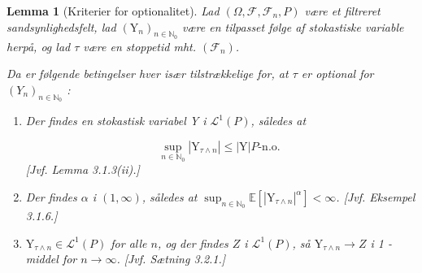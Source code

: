 \documentclass{article}
\newcommand{\1}{\mathbbm{1}}
\theoremstyle{boxed}
\newtheorem{lemma}[theorem]{Lemma}
\begin{document}
\begin{theorem-box}
    \begin{lemma}[Kriterier for optionalitet]
        Lad $\left(\Omega, \mathcal{F}, \mathcal{F}_n, P\right)$ være et filtreret sandsynlighedsfelt, lad $\left(\mathrm{Y}_n\right)_{n \in \mathbb{N}_0}$ være en tilpasset følge af stokastiske variable herpå, og lad $\tau$ være en stoppetid mht. $\left(\mathcal{F}_n\right)$.

Da er følgende betingelser hver især tilstrækkelige for, at $\tau$ er optional for $\left(Y_n\right)_{n \in \mathbb{N}_0}$ :
\begin{enumerate}
    \item Der findes en stokastisk variabel Y i $\mathcal{L}^1(P)$, således at

$$
\sup _{n \in \mathbb{N}_0}\left|\mathrm{Y}_{\tau \wedge n}\right| \leq|\mathrm{Y}| P \text {-n.o. }
$$
[Jvf. Lemma 3.1.3(ii).]
\item  Der findes $\alpha$ i $(1, \infty)$, således at $\sup _{n \in \mathbb{N}_0} \mathbb{E}\left[\left|\mathrm{Y}_{\tau \wedge n}\right|^\alpha\right]<\infty$.
[Jvf. Eksempel 3.1.6.]
\item $\mathrm{Y}_{\tau \wedge n} \in \mathcal{L}^1(P)$ for alle $n$, og der findes $Z$ i $\mathcal{L}^1(P)$, så $\mathrm{Y}_{\tau \wedge n} \rightarrow Z$ i 1 -middel for $n \rightarrow \infty$.
[Jvf. Sætning 3.2.1.]
\end{enumerate}
    \end{lemma}
\end{theorem-box}
\end{document}
